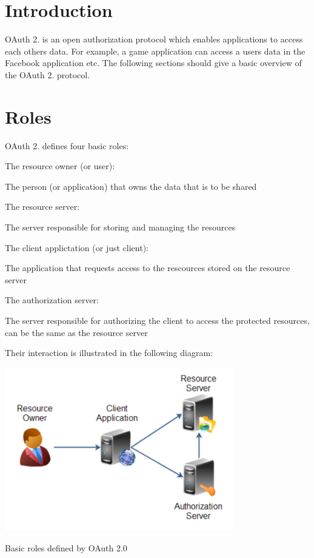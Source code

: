 \hypertarget{oauth_intro_oauth}{}\section{\-Introduction}\label{oauth_intro_oauth}
\-O\-Auth 2. is an open authorization protocol which enables applications to access each others data. \-For example, a game application can access a users data in the \-Facebook application etc. \-The following sections should give a basic overview of the \-O\-Auth 2. protocol.\hypertarget{oauth_roles}{}\section{\-Roles}\label{oauth_roles}
\-O\-Auth 2. defines four basic roles\-:
\begin{DoxyItemize}
\item \-The resource owner (or user)\-: \par
 \-The person (or application) that owns the data that is to be shared \par
\par

\item \-The resource server\-: \par
 \-The server responsible for storing and managing the resources \par
\par

\item \-The client applictation (or just client)\-: \par
 \-The application that requests access to the rescources stored on the resource server \par
\par

\item \-The authorization server\-: \par
 \-The server responsible for authorizing the client to access the protected resources, can be the same as the resource server
\end{DoxyItemize}\-Their interaction is illustrated in the following diagram\-:  
\begin{DoxyImage}
\includegraphics[width=10cm]{overview-roles}
\caption{\-Basic roles defined by \-O\-Auth 2.0}
\end{DoxyImage}
